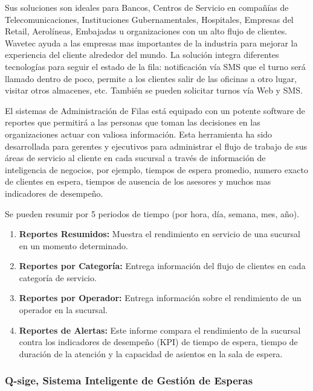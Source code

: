 Sus soluciones son ideales para Bancos, Centros de Servicio en compañías de Telecomunicaciones, Instituciones Gubernamentales, Hospitales, Empresas del Retail, Aerolíneas, Embajadas u organizaciones con un alto flujo de clientes.  Wavetec ayuda a las empresas mas importantes de la industria para mejorar la experiencia del cliente alrededor del mundo. La solución integra diferentes tecnologías para seguir el estado de la fila: notificación vía SMS que el turno será llamado dentro de poco, permite a los clientes salir de las oficinas a otro lugar, visitar otros almacenes, etc. También se pueden solicitar turnos vía Web y SMS.\\


El sistemas de Administración de Filas está equipado con un potente software de reportes que permitirá a las personas que toman las decisiones en las organizaciones actuar con valiosa información. Esta herramienta ha sido desarrollada para gerentes y ejecutivos para administrar el flujo de trabajo de sus áreas de servicio al cliente en cada sucursal a través de información de inteligencia de negocios, por ejemplo, tiempos de espera promedio, numero exacto de clientes en espera, tiempos de ausencia de los asesores y muchos mas indicadores de desempeño.\\


Se pueden resumir por 5 periodos de tiempo (por hora, día, semana, mes, año).

\begin{enumerate}
\item \textbf{Reportes Resumidos:} Muestra el rendimiento en servicio de una sucursal en un momento determinado.
\item \textbf{Reportes por Categoría:} Entrega información del flujo de clientes en cada categoría de servicio.
\item \textbf{Reportes por Operador:} Entrega información sobre el rendimiento de un operador en la sucursal.
\item \textbf{Reportes de Alertas:} Este informe compara el rendimiento de la sucursal contra los indicadores de desempeño (KPI) de tiempo de espera, tiempo de duración de la atención y la capacidad de asientos en la sala de espera.
\end{enumerate}

\subsubsection{Q-sige, Sistema Inteligente de Gestión de Esperas}

